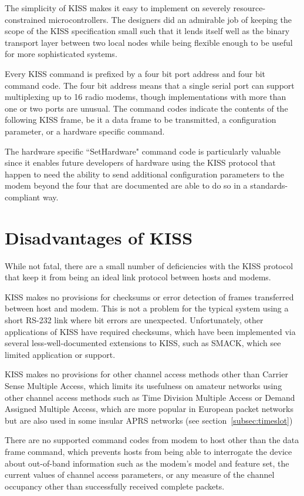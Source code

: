 The simplicity of KISS makes it easy to implement on severely resource-constrained
microcontrollers. The designers did an admirable job of keeping the scope of the KISS
specification small such that it lends itself well as the binary transport
layer between two local nodes while being flexible enough to be useful for
more sophisticated systems.

Every KISS command is prefixed by a four bit port address and four bit 
command code. The four bit address means that a single serial port can 
support multiplexing up to 16 radio modems, though implementations with more
than one or two ports are unusual. The command codes indicate the contents of the 
following KISS frame, be it a data frame to be transmitted, a configuration
parameter, or a hardware specific command.

The hardware specific ``SetHardware" command code is particularly valuable
since it enables future developers of hardware using the KISS protocol
that happen to need the ability to send additional configuration parameters
to the modem beyond the four that are documented are able to do so in a
standards-compliant way.

\section{Disadvantages of KISS}

While not fatal, there are a small number of deficiencies with the KISS
protocol that keep it from being an ideal link protocol between hosts and modems.

KISS makes no provisions for checksums or error detection of frames transferred
between host and modem. This is not a problem for the typical system
using a short RS-232 link where bit errors are unexpected.
Unfortunately, other applications of KISS have required checksums, which
have been implemented via
several less-well-documented extensions to KISS, such as SMACK\cite{smack}, 
which see limited application or support.

KISS makes no provisions for other channel access methods other than
Carrier Sense Multiple Access, which limits its usefulness on amateur networks
using other channel access methods such as Time Division Multiple Access
or Demand Assigned Multiple Access, which are more popular in European 
packet networks but are also used in some insular APRS networks 
(see section~\ref{subsec:timeslot})

There are no supported command codes from modem to host other than the data frame
command, which prevents hosts from being able to interrogate the device 
about out-of-band information such as the modem's model and feature set,
the current values of channel access parameters, or any measure of the 
channel occupancy other than successfully received complete packets.


